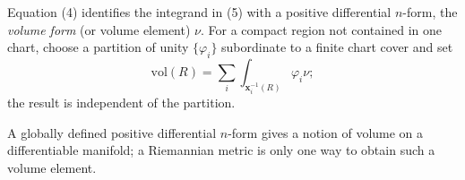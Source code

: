 \begin{remark}
  \label{rem:dc-ch1-2-11}
  Equation (4) identifies the integrand in (5) with a positive differential
  $n$-form, the \emph{volume form} (or volume element) $\nu$. For a compact region
  not contained in one chart, choose a partition of unity $\{\varphi_i\}$ subordinate
  to a finite chart cover and set
  $$
  \mathrm{vol}(R)=\sum_i\int_{\mathbf{x}_i^{-1}(R)}\varphi_i\nu;
  $$
  the result is independent of the partition.
\end{remark}

\begin{remark}
  \label{rem:dc-ch1-2-12}
  A globally defined positive differential $n$-form gives a notion of volume on a
  differentiable manifold; a Riemannian metric is only one way to obtain such a
  volume element.
\end{remark}
